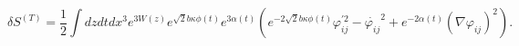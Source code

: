 \begin{equation}
\delta S^{(T)}=\frac{1}{2}\int dz dt dx^3 e^{3 W(z)} e^{ \sqrt{2} b \kappa \phi(t)}
e^{3 \alpha(t)}(e^{-2 \sqrt{2} b \kappa \phi(t)} \varphi_{ij}^{'2}- \dot{\varphi_{ij}}^2
+e^{-2 \alpha(t)} (\nabla \varphi_{ij})^2).
\end{equation}

